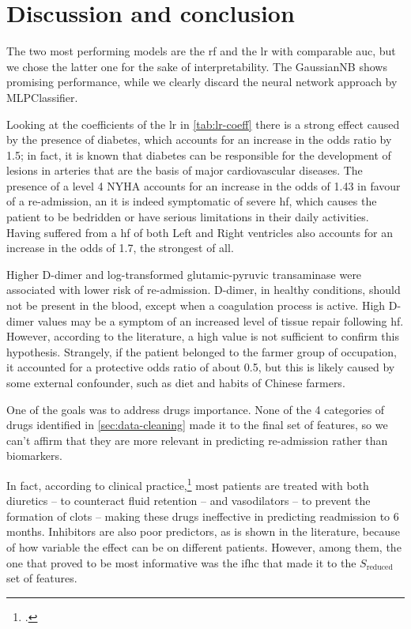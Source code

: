 \section{Discussion and conclusion}

The two most performing models are the \gls{rf} and the \gls{lr} with comparable \gls{auc}, but we chose the latter one for the sake of interpretability. The GaussianNB shows promising performance, while we clearly discard the neural network approach by MLPClassifier.

Looking at the coefficients of the \gls{lr} in \autoref{tab:lr-coeff} there is a strong effect caused by the presence of diabetes, which accounts for an increase in the odds ratio by 1.5; in fact, it is known that diabetes can be responsible for the development of lesions in arteries that are the basis of major cardiovascular diseases.
The presence of a level 4 NYHA accounts for an increase in the odds of 1.43 in favour of a re-admission, an it is indeed symptomatic of severe \gls{hf}, which causes the patient to be bedridden or have serious limitations in their daily activities.
Having suffered from a \gls{hf} of both Left and Right ventricles also accounts for an increase in the odds of 1.7, the strongest of all.

Higher D-dimer and log-transformed glutamic-pyruvic transaminase were associated with lower risk of re-admission.
D-dimer, in healthy conditions, should not be present in the blood, except when a coagulation process is active. High D-dimer values may be a symptom of an increased level of tissue repair following \gls{hf}. However, according to the literature, a high value is not sufficient to confirm this hypothesis.
Strangely, if the patient belonged to the farmer group of occupation, it accounted for a protective odds ratio of about 0.5, but this is likely caused by some external confounder, such as diet and habits of Chinese farmers.

One of the goals was to address drugs importance. None of the 4 categories of drugs identified in \autoref{sec:data-cleaning} made it to the final set of features, so we can't affirm that they are more relevant in predicting re-admission rather than biomarkers.

In fact, according to clinical practice,\footcite{Lonn2000Regular} most patients are treated with both diuretics -- to counteract fluid retention -- and vasodilators -- to prevent the formation of clots -- making these drugs ineffective in predicting readmission to 6 months.
Inhibitors are also poor predictors, as is shown in the literature, because of how variable the effect can be on different patients.
However, among them, the one that proved to be most informative was the \gls{ifhc} that made it to the $S_{\text{reduced}}$ set of features.

